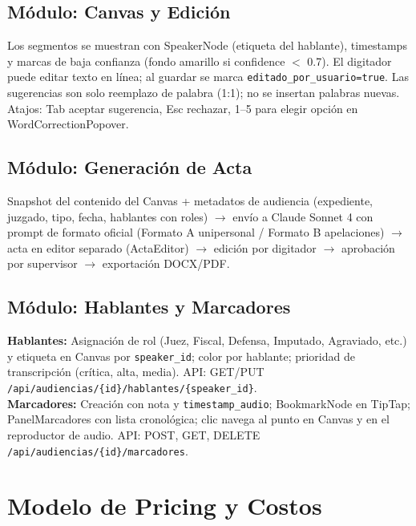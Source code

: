 \documentclass[12pt,a4paper]{report}
\begin{document}
\section{Módulo: Canvas y Edición}

Los segmentos se muestran con SpeakerNode (etiqueta del hablante), timestamps y marcas de baja confianza (fondo amarillo si confidence $<$ 0.7). El digitador puede editar texto en línea; al guardar se marca \texttt{editado\_por\_usuario=true}. Las sugerencias son solo reemplazo de palabra (1:1); no se insertan palabras nuevas. Atajos: Tab aceptar sugerencia, Esc rechazar, 1--5 para elegir opción en WordCorrectionPopover.

\section{Módulo: Generación de Acta}

Snapshot del contenido del Canvas + metadatos de audiencia (expediente, juzgado, tipo, fecha, hablantes con roles) $\to$ envío a Claude Sonnet 4 con prompt de formato oficial (Formato A unipersonal / Formato B apelaciones) $\to$ acta en editor separado (ActaEditor) $\to$ edición por digitador $\to$ aprobación por supervisor $\to$ exportación DOCX/PDF.

\section{Módulo: Hablantes y Marcadores}

\textbf{Hablantes:} Asignación de rol (Juez, Fiscal, Defensa, Imputado, Agraviado, etc.) y etiqueta en Canvas por \texttt{speaker\_id}; color por hablante; prioridad de transcripción (crítica, alta, media). API: GET/PUT \texttt{/api/audiencias/\{id\}/hablantes/\{speaker\_id\}}. \\
\textbf{Marcadores:} Creación con nota y \texttt{timestamp\_audio}; BookmarkNode en TipTap; PanelMarcadores con lista cronológica; clic navega al punto en Canvas y en el reproductor de audio. API: POST, GET, DELETE \texttt{/api/audiencias/\{id\}/marcadores}.

\chapter{Modelo de Pricing y Costos}
\end{document}
